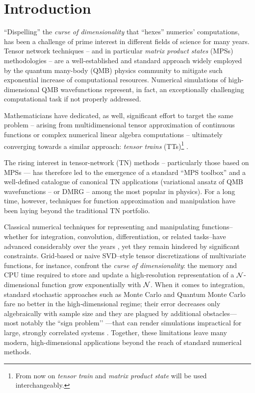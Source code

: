 \chapter{Introduction}
\label{chap:intro}
``Dispelling'' the \textit{curse of dimensionality} that ``hexes'' numerics' computations, has been a challenge of prime interest in different fields of science for many years. 
Tensor network techniques -- and in particular \textit{matrix product states} (MPSs) methodologies -- are a well-established \cite{Fannes1992,White1992,Schollwock2011,Vidal2003,VerstraeteCirac2004,vonDelftTNNotes,tensornetwork.org} and standard approach widely employed by the quantum many-body (QMB) physics community to mitigate such exponential increase of computational resources. Numerical simulations of high-dimensional QMB wavefunctions represent, in fact, an exceptionally challenging computational task if not properly addressed.

Mathematicians have dedicated, as well, significant effort to target the same problem -- arising from multidimensional tensor approximation of continuous functions or complex numerical linear algebra computations \cite{Oseledets2009Intro, Kolda2009} -- ultimately converging towards a similar approach: \textit{tensor trains} (TTs)\footnote{From now on \textit{tensor train} and \textit{matrix product state} will be used interchangeably.} \cite{Oseledets2011}. 

The rising interest in tensor-network (TN) methods -- particularly those based on MPSs — has therefore led to the emergence of a standard ``MPS toolbox'' \cite{ttpylib, ITensors.jl, QSpace} and a well-defined catalogue of canonical TN applications \cite{Verstraete2008} (variational ansatz of QMB wavefunctions -- or DMRG -- among the most popular in physics). For a long time, however, techniques for function approximation and manipulation have been laying beyond the traditional TN portfolio.


Classical numerical techniques for representing and manipulating functions--whether for integration, convolution, differentiation, or related tasks--have advanced considerably over the years \cite{Isaacson1994}, yet they remain hindered by significant constraints. Grid‐based or naive SVD–style tensor discretizations of multivariate functions, for instance, confront the \emph{curse of dimensionality}: the memory and CPU time required to store and update a high‐resolution representation of a $\mathcal{N}$-dimensional function grow exponentially with 
$\mathcal{N}$. When it comes to integration, standard stochastic approaches such as Monte Carlo and Quantum Monte Carlo fare no better in the high‐dimensional regime; their error decreases only algebraically with sample size and they are plagued by additional obstacles—most notably the “sign problem’’ \cite{Loh1990}—that can render simulations impractical for large, strongly correlated systems \cite{Fernandez2022}. Together, these limitations leave many modern, high-dimensional applications beyond the reach of standard numerical methods.

